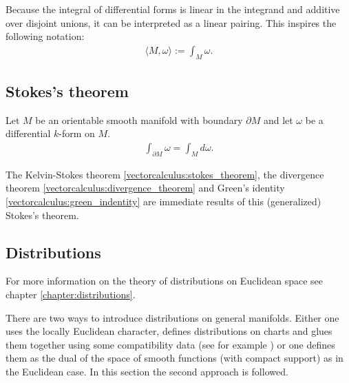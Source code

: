 
    \begin{notation}
        Because the integral of differential forms is linear in the integrand and additive over disjoint unions, it can be interpreted as a linear pairing. This inspires the following notation:
        \begin{gather}
            \langle M,\omega \rangle := \int_M\omega.
        \end{gather}
    \end{notation}

\subsection{Stokes's theorem}

    \begin{theorem}\label{diff:stokes_theorem}
        Let $M$ be an orientable smooth manifold with boundary $\partial M$ and let $\omega$ be a differential $k$-form on $M$.
        \begin{gather}
            \int_{\partial M}\omega = \int_M d\omega.
        \end{gather}
    \end{theorem}
    \begin{result}
        The Kelvin-Stokes theorem \ref{vectorcalculus:stokes_theorem}, the divergence theorem \ref{vectorcalculus:divergence_theorem} and Green's identity \ref{vectorcalculus:green_indentity} are immediate results of this (generalized) Stokes's theorem.
    \end{result}

\subsection{Distributions}

    For more information on the theory of distributions on Euclidean space see chapter \ref{chapter:distributions}.

    There are two ways to introduce distributions on general manifolds. Either one uses the locally Euclidean character, defines distributions on charts and glues them together using some compatibility data (see for example \cite{AMP1}) or one defines them as the dual of the space of smooth functions (with compact support) as in the Euclidean case. In this section the second approach is followed.

